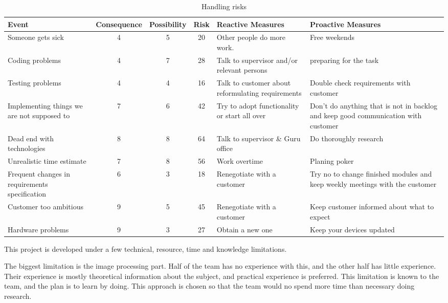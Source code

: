 \begin{table}

    \caption{Handling risks}
    \label{tab:risks}
    
    \centering {}
    \vspace{2mm} %
    \begin{tabularx}{500pt}{XcccXX}
    \toprule[0.5mm]
        Event & Consequence & Possibility & Risk  & Reactive Measures & Proactive Measures \\
    \midrule
Someone gets sick & 4     & 5     & 20    & Other people do more work.  & Free weekends \\
Coding problems & 4     & 7     & 28    & Talk to supervisor and/or relevant persons & preparing for the task \\
Testing problems & 4     & 4     & 16    & Talk to customer about reformulating requirements & Double check requirements with customer \\
Implementing things we are not supposed to & 7     & 6     & 42    & Try to adopt functionality or start all over & Don't do anything that is not in backlog and keep good communication with customer \\
Dead end with technologies & 8     & 8     & 64    & Talk to supervisor \& Guru office & Do thoroughly research \\
Unrealistic time estimate & 7     & 8     & 56    & Work overtime  & Planing poker \\
Frequent changes in requirements specification & 6     & 3     & 18    & Renegotiate with a customer & Try no to change finished modules and keep weekly meetings with the customer \\
Customer too ambitious & 9     & 5     & 45    & Renegotiate with a customer & Keep customer informed about what  to expect \\
Hardware problems & 9     & 3     & 27    & Obtain a new one & Keep your devices updated \\
\bottomrule[0.5mm]
\end{tabularx}
\end{table}

\label{sec:limitations}
This project is developed under a few technical, resource, time and knowledge limitations. 

The biggest limitation is the image processing part. Half of the team has no experience with this, and the other half has little experience. Their experience is mostly theoretical information about the subject, and practical experience is preferred. This limitation is known to the team, and the plan is to learn by doing. This approach is chosen so that the team would no spend more time than necessary doing research.

